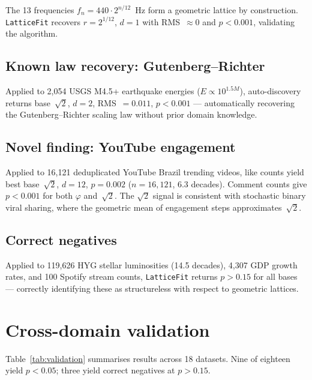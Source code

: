 \documentclass[10pt,a4paper]{article}
\begin{document}
The 13 frequencies $f_n = 440 \cdot 2^{n/12}$~Hz form a geometric
lattice by construction. \texttt{LatticeFit} recovers
$r = 2^{1/12}$, $d = 1$ with RMS~$\approx 0$ and $p < 0.001$,
validating the algorithm.

\subsection{Known law recovery: Gutenberg--Richter}

Applied to 2,054 USGS M4.5+ earthquake energies ($E \propto 10^{1.5M}$),
auto-discovery returns base~$\sqrt{2}$, $d = 2$, RMS~$= 0.011$,
$p < 0.001$ --- automatically recovering the Gutenberg--Richter
scaling law without prior domain knowledge.

\subsection{Novel finding: YouTube engagement}

Applied to 16,121 deduplicated YouTube Brazil trending videos,
like counts yield best base~$\sqrt{2}$, $d = 12$, $p = 0.002$
($n = 16{,}121$, 6.3 decades). Comment counts give $p < 0.001$
for both $\varphi$ and~$\sqrt{2}$. The $\sqrt{2}$ signal is
consistent with stochastic binary viral sharing, where the
geometric mean of engagement steps approximates~$\sqrt{2}$.

\subsection{Correct negatives}

Applied to 119,626 HYG stellar luminosities (14.5 decades),
4,307 GDP growth rates, and 100 Spotify stream counts,
\texttt{LatticeFit} returns $p > 0.15$ for all bases ---
correctly identifying these as structureless with respect
to geometric lattices.

\section{Cross-domain validation}

Table~\ref{tab:validation} summarises results across 18 datasets.
Nine of eighteen yield $p < 0.05$; three yield correct negatives
at $p > 0.15$.
\end{document}
